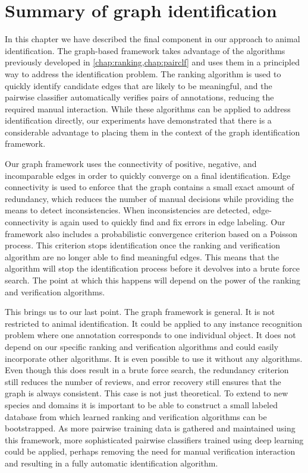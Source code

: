  
\FloatBarrier{}
\section{Summary of graph identification}\label{sec:graphconclusion}

In this chapter we have described the final component in our approach to animal identification.
The graph-based framework takes advantage of the algorithms previously developed in
  \cref{chap:ranking,chap:pairclf} and uses them in a principled way to address the identification problem.
The ranking algorithm is used to quickly identify candidate edges that are likely to be meaningful, and the
  pairwise classifier automatically verifies pairs of annotations, reducing the required manual interaction.
While these algorithms can be applied to address identification directly, our experiments have demonstrated that
  there is a considerable advantage to placing them in the context of the graph identification framework.

Our graph framework uses the connectivity of positive, negative, and incomparable edges in order to quickly
  converge on a final identification.
Edge connectivity is used to enforce that the graph contains a small exact amount of redundancy, which reduces
  the number of manual decisions while providing the means to detect inconsistencies.
When inconsistencies are detected, edge-connectivity is again used to quickly find and fix errors in edge
  labeling.
Our framework also includes a probabilistic convergence criterion based on a Poisson process.
This criterion stops identification once the ranking and verification algorithm are no longer able to find
  meaningful edges.
This means that the algorithm will stop the identification process before it devolves into a brute force search.
The point at which this happens will depend on the power of the ranking and verification algorithms.

This brings us to our last point.
The graph framework is general.
It is not restricted to animal identification.
It could be applied to any instance recognition problem where one annotation corresponds to one individual
  object.
It does not depend on our specific ranking and verification algorithms and could easily incorporate other
  algorithms.
It is even possible to use it without any algorithms.
Even though this does result in a brute force search, the redundancy criterion still reduces the number of
  reviews, and error recovery still ensures that the graph is always consistent.
This case is not just theoretical.
To extend to new species and domains it is important to be able to construct a small labeled database from which
  learned ranking and verification algorithms can be bootstrapped.
As more pairwise training data is gathered and maintained using this framework, more sophisticated pairwise
  classifiers trained using deep learning could be applied, perhaps removing the need for manual verification
  interaction and resulting in a fully automatic identification algorithm.

